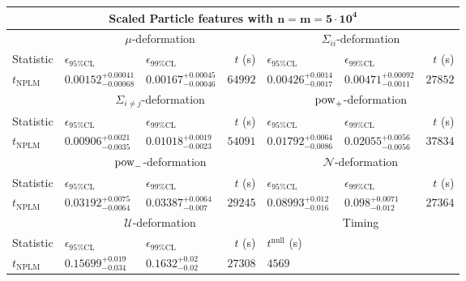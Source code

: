 \begin{tabular}{l|llr|llr}
	\toprule
	\multicolumn{7}{c}{{\bf Scaled Particle features with $\mathbf{n=m=5\cdot 10^{4}}$}} \\
	\toprule
	\multicolumn{1}{c}{} & \multicolumn{3}{c}{$\mu$-deformation} & \multicolumn{3}{c}{$\Sigma_{ii}$-deformation} \\
	Statistic & $\epsilon_{95\%\mathrm{CL}}$ & $\epsilon_{99\%\mathrm{CL}}$ & $t$ (s) & $\epsilon_{95\%\mathrm{CL}}$ & $\epsilon_{99\%\mathrm{CL}}$ & $t$ (s) \\
	\midrule
	$t_{\mathrm{NPLM}}$ & $0.00152_{-0.00068}^{+0.00041}$ & $0.00167_{-0.00046}^{+0.00045}$ & $64992$ & $0.00426_{-0.0017}^{+0.0014}$ & $0.00471_{-0.0011}^{+0.00092}$ & $27852$ \\
	\toprule
	\multicolumn{1}{c}{} & \multicolumn{3}{c}{$\Sigma_{i\neq j}$-deformation} & \multicolumn{3}{c}{$\rm{pow}_{+}$-deformation} \\
	Statistic & $\epsilon_{95\%\mathrm{CL}}$ & $\epsilon_{99\%\mathrm{CL}}$ & $t$ (s) & $\epsilon_{95\%\mathrm{CL}}$ & $\epsilon_{99\%\mathrm{CL}}$ & $t$ (s) \\
	\midrule
	$t_{\mathrm{NPLM}}$ & $0.00906_{-0.0035}^{+0.0021}$ & $0.01018_{-0.0023}^{+0.0019}$ & $54091$ & $0.01792_{-0.0086}^{+0.0064}$ & $0.02055_{-0.0056}^{+0.0056}$ & $37834$ \\
	\toprule
	\multicolumn{1}{c}{} & \multicolumn{3}{c}{$\rm{pow}_{-}$-deformation} & \multicolumn{3}{c}{$\mathcal{N}$-deformation} \\
	Statistic & $\epsilon_{95\%\mathrm{CL}}$ & $\epsilon_{99\%\mathrm{CL}}$ & $t$ (s) & $\epsilon_{95\%\mathrm{CL}}$ & $\epsilon_{99\%\mathrm{CL}}$ & $t$ (s) \\
	\midrule
	$t_{\mathrm{NPLM}}$ & $0.03192_{-0.0064}^{+0.0075}$ & $0.03387_{-0.007}^{+0.0064}$ & $29245$ & $0.08993_{-0.016}^{+0.012}$ & $0.098_{-0.012}^{+0.0071}$ & $27364$ \\
	\toprule
	\multicolumn{1}{c}{} & \multicolumn{3}{c}{$\mathcal{U}$-deformation} & \multicolumn{3}{c}{Timing} \\
	Statistic & $\epsilon_{95\%\mathrm{CL}}$ & $\epsilon_{99\%\mathrm{CL}}$ & $t$ (s) & $t^{\mathrm{null}}$ (s) \\
	\midrule
	$t_{\mathrm{NPLM}}$ & $0.15699_{-0.034}^{+0.019}$ & $0.1632_{-0.02}^{+0.02}$ & $27308$ & $4569$ \\
	\bottomrule
\end{tabular}